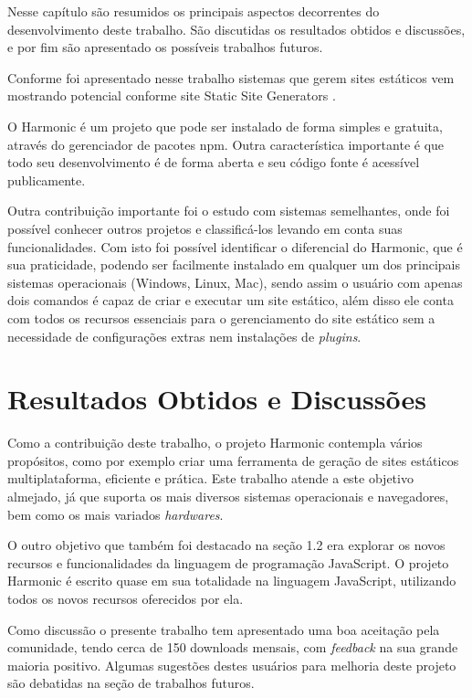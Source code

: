 \documentclass[ppginf, pep]{esinucpel}
\begin{document}
\vspace*{-1cm}

Nesse capítulo são resumidos os principais aspectos decorrentes do desenvolvimento deste trabalho. São discutidas os resultados obtidos e discussões, e por fim são apresentado os possíveis trabalhos futuros.

Conforme foi apresentado nesse trabalho  sistemas que gerem sites estáticos vem mostrando potencial conforme site Static Site Generators \cite{staticsitegenerators}.

O Harmonic é um projeto que pode ser instalado de forma simples e gratuita, através do gerenciador de pacotes npm. Outra característica importante é que todo seu desenvolvimento é de forma aberta e seu código fonte é acessível publicamente.

Outra contribuição importante foi o estudo com sistemas semelhantes, onde foi possível conhecer outros projetos e classificá-los levando em conta suas funcionalidades. Com isto foi possível identificar o diferencial do Harmonic, que é sua praticidade, podendo ser facilmente instalado em qualquer um dos principais sistemas operacionais (Windows, Linux, Mac), sendo assim o usuário com apenas dois comandos é capaz de criar e executar um site estático, além disso ele conta com todos os recursos essenciais para o gerenciamento do site estático sem a necessidade de configurações extras nem instalações de \textit{plugins}.

\section{Resultados Obtidos e Discussões}

Como a contribuição deste trabalho, o projeto Harmonic contempla vários propósitos, como por exemplo criar uma ferramenta de geração de sites estáticos multiplataforma, eficiente e prática. Este trabalho atende a este objetivo almejado, já que suporta os mais diversos sistemas operacionais e navegadores, bem como os mais variados \textit{hardwares}.

O outro objetivo que também foi destacado na seção 1.2 era explorar os novos recursos e funcionalidades da linguagem de programação JavaScript. O projeto Harmonic é escrito quase em sua totalidade na linguagem JavaScript, utilizando todos os novos recursos oferecidos por ela.

Como discussão o presente trabalho tem apresentado uma boa aceitação pela comunidade, tendo cerca de 150 downloads mensais, com \textit{feedback} na sua grande maioria positivo. Algumas sugestões destes usuários para melhoria deste projeto são debatidas na seção de trabalhos futuros.
\end{document}
